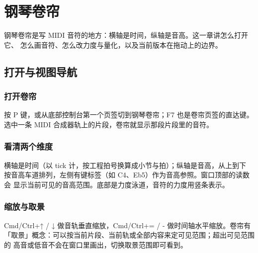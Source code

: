 
\chapter{钢琴卷帘}
\label{ch:piano-roll}






钢琴卷帘是写 MIDI 音符的地方：横轴是时间，纵轴是音高。这一章讲怎么打开它、
怎么画音符、怎么改力度与量化，以及当前版本在拖动上的边界。

\section{打开与视图导航}

\subsection{打开卷帘}

按 P 键，或从底部控制台第一个页签切到钢琴卷帘；F7 也是卷帘页签的直达键。
选中一条 MIDI 合成器轨上的片段，卷帘就显示那段片段里的音符。

\subsection{看清两个维度}

横轴是时间（以 tick 计，按工程拍号换算成小节与拍）；纵轴是音高，从上到下
按音高车道排列，左侧有键标签（如 C4、Eb5）作为音高参照。窗口顶部的读数会
显示当前可见的音高范围。底部是力度泳道，音符的力度用竖条表示。


\subsection{缩放与取景}

Cmd/Ctrl+↑ / ↓ 做音轨垂直缩放，Cmd/Ctrl+= / - 做时间轴水平缩放。卷帘有
「取景」概念：可以按当前片段、当前轨或全部内容来定可见范围；超出可见范围的
高音或低音不会在窗口里画出，切换取景范围即可看到。

